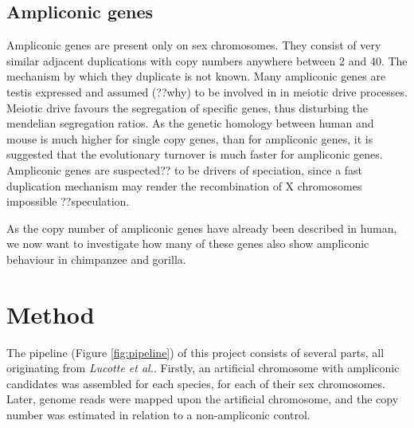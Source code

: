 \documentclass[
journal=jacsat, %
manuscript=article]{achemso}
\begin{document}
\subsection{Ampliconic genes} %
Ampliconic genes are present only on sex chromosomes. They consist of very similar adjacent duplications with copy numbers anywhere between 2 and 40. The mechanism by which they duplicate is not known. Many ampliconic genes are testis expressed and assumed (??why) to be involved in in meiotic drive processes. Meiotic drive favours the segregation of specific genes, thus disturbing the mendelian segregation ratios. As the genetic homology between human and mouse is much higher for single copy genes, than for ampliconic genes, it is suggested that the evolutionary turnover is much faster for ampliconic genes. Ampliconic genes are suspected?? to be drivers of speciation, since a fast duplication mechanism may render the recombination of X chromosomes impossible ??speculation.


As the copy number of ampliconic genes have already been described in human, we now want to investigate how many of these genes also show ampliconic behaviour in chimpanzee and gorilla.



\clearpage
\section{Method}

The pipeline\cite{cmkpipe} (Figure \ref{fig:pipeline}) of this project consists of several parts, all originating from \textit{Lucotte et al.\cite{LucotteDyn}}. Firstly, an artificial chromosome with ampliconic candidates was assembled for each species, for each of their sex chromosomes. Later, genome reads were mapped upon the artificial chromosome, and the copy number was estimated in relation to a non-ampliconic control.
\end{document}
